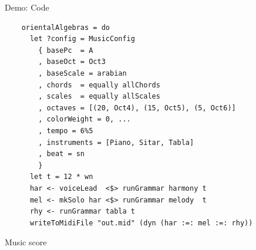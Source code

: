 \documentclass{beamer}
\begin{document}
	\begin{frame}[fragile=singleslide]{Demo: Code}
	\begin{verbatim}
    orientalAlgebras = do
      let ?config = MusicConfig
        { basePc  = A
        , baseOct = Oct3
        , baseScale = arabian
        , chords  = equally allChords
        , scales  = equally allScales
        , octaves = [(20, Oct4), (15, Oct5), (5, Oct6)]
        , colorWeight = 0, ...
        , tempo = 6%5
        , instruments = [Piano, Sitar, Tabla]
        , beat = sn
        }
      let t = 12 * wn
      har <- voiceLead  <$> runGrammar harmony t
      mel <- mkSolo har <$> runGrammar melody  t
      rhy <- runGrammar tabla t
      writeToMidiFile "out.mid" (dyn (har :=: mel :=: rhy))
	\end{verbatim}
  	\end{frame}

	\begin{frame}[c]{Music score}
	\centering
	\vspace{-1.2cm}
	\begin{center}
    \end{center}
	\end{frame}
\end{document}
